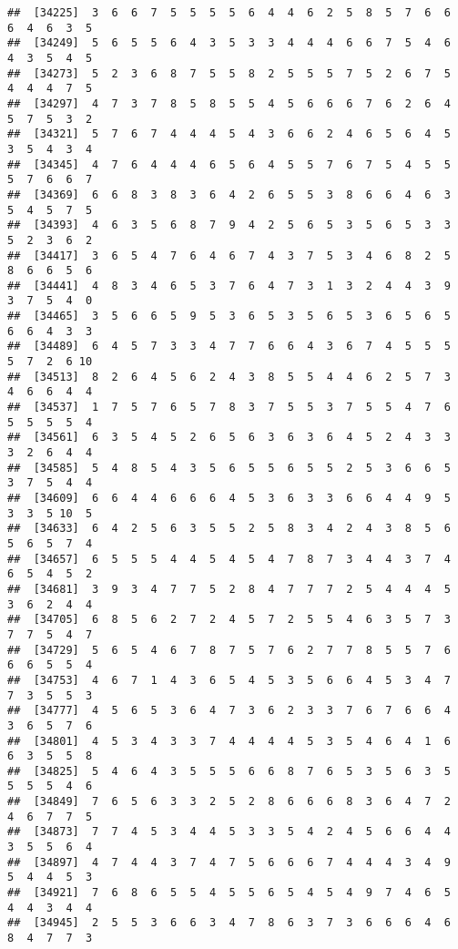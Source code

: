 \documentclass[
]{book}
\begin{document}
\begin{verbatim}
##  [34225]  3  6  6  7  5  5  5  5  6  4  4  6  2  5  8  5  7  6  6  6  4  6  3  5
##  [34249]  5  6  5  5  6  4  3  5  3  3  4  4  4  6  6  7  5  4  6  4  3  5  4  5
##  [34273]  5  2  3  6  8  7  5  5  8  2  5  5  5  7  5  2  6  7  5  4  4  4  7  5
##  [34297]  4  7  3  7  8  5  8  5  5  4  5  6  6  6  7  6  2  6  4  5  7  5  3  2
##  [34321]  5  7  6  7  4  4  4  5  4  3  6  6  2  4  6  5  6  4  5  3  5  4  3  4
##  [34345]  4  7  6  4  4  4  6  5  6  4  5  5  7  6  7  5  4  5  5  5  7  6  6  7
##  [34369]  6  6  8  3  8  3  6  4  2  6  5  5  3  8  6  6  4  6  3  5  4  5  7  5
##  [34393]  4  6  3  5  6  8  7  9  4  2  5  6  5  3  5  6  5  3  3  5  2  3  6  2
##  [34417]  3  6  5  4  7  6  4  6  7  4  3  7  5  3  4  6  8  2  5  8  6  6  5  6
##  [34441]  4  8  3  4  6  5  3  7  6  4  7  3  1  3  2  4  4  3  9  3  7  5  4  0
##  [34465]  3  5  6  6  5  9  5  3  6  5  3  5  6  5  3  6  5  6  5  6  6  4  3  3
##  [34489]  6  4  5  7  3  3  4  7  7  6  6  4  3  6  7  4  5  5  5  5  7  2  6 10
##  [34513]  8  2  6  4  5  6  2  4  3  8  5  5  4  4  6  2  5  7  3  4  6  6  4  4
##  [34537]  1  7  5  7  6  5  7  8  3  7  5  5  3  7  5  5  4  7  6  5  5  5  5  4
##  [34561]  6  3  5  4  5  2  6  5  6  3  6  3  6  4  5  2  4  3  3  3  2  6  4  4
##  [34585]  5  4  8  5  4  3  5  6  5  5  6  5  5  2  5  3  6  6  5  3  7  5  4  4
##  [34609]  6  6  4  4  6  6  6  4  5  3  6  3  3  6  6  4  4  9  5  3  3  5 10  5
##  [34633]  6  4  2  5  6  3  5  5  2  5  8  3  4  2  4  3  8  5  6  5  6  5  7  4
##  [34657]  6  5  5  5  4  4  5  4  5  4  7  8  7  3  4  4  3  7  4  6  5  4  5  2
##  [34681]  3  9  3  4  7  7  5  2  8  4  7  7  7  2  5  4  4  4  5  3  6  2  4  4
##  [34705]  6  8  5  6  2  7  2  4  5  7  2  5  5  4  6  3  5  7  3  7  7  5  4  7
##  [34729]  5  6  5  4  6  7  8  7  5  7  6  2  7  7  8  5  5  7  6  6  6  5  5  4
##  [34753]  4  6  7  1  4  3  6  5  4  5  3  5  6  6  4  5  3  4  7  7  3  5  5  3
##  [34777]  4  5  6  5  3  6  4  7  3  6  2  3  3  7  6  7  6  6  4  3  6  5  7  6
##  [34801]  4  5  3  4  3  3  7  4  4  4  4  5  3  5  4  6  4  1  6  6  3  5  5  8
##  [34825]  5  4  6  4  3  5  5  5  6  6  8  7  6  5  3  5  6  3  5  5  5  5  4  6
##  [34849]  7  6  5  6  3  3  2  5  2  8  6  6  6  8  3  6  4  7  2  4  6  7  7  5
##  [34873]  7  7  4  5  3  4  4  5  3  3  5  4  2  4  5  6  6  4  4  3  5  5  6  4
##  [34897]  4  7  4  4  3  7  4  7  5  6  6  6  7  4  4  4  3  4  9  5  4  4  5  3
##  [34921]  7  6  8  6  5  5  4  5  5  6  5  4  5  4  9  7  4  6  5  4  4  3  4  4
##  [34945]  2  5  5  3  6  6  3  4  7  8  6  3  7  3  6  6  6  4  6  8  4  7  7  3

\end{verbatim}
\end{document}

